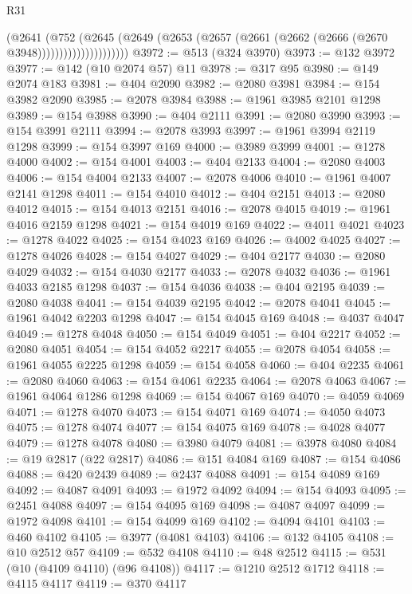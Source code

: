 \begin{lexlean}{R31}
\begin{coremodule}
                          (@2641
                            (@752
                              (@2645
                                (@2649
                                  (@2653
                                    (@2657 (@2661 (@2662 (@2666 (@2670 @3948)))))))))))))))))))))
@3972 := @513 (@324 @3970)
@3973 := @132 @3972
@3977 := @142 (@10 @2074 @57) @11
@3978 := @317 @95
@3980 := @149 @2074 @183
@3981 := @404 @2090
@3982 := @2080 @3981
@3984 := @154 @3982 @2090
@3985 := @2078 @3984
@3988 := @1961 @3985 @2101 @1298
@3989 := @154 @3988
@3990 := @404 @2111
@3991 := @2080 @3990
@3993 := @154 @3991 @2111
@3994 := @2078 @3993
@3997 := @1961 @3994 @2119 @1298
@3999 := @154 @3997 @169
@4000 := @3989 @3999
@4001 := @1278 @4000
@4002 := @154 @4001
@4003 := @404 @2133
@4004 := @2080 @4003
@4006 := @154 @4004 @2133
@4007 := @2078 @4006
@4010 := @1961 @4007 @2141 @1298
@4011 := @154 @4010
@4012 := @404 @2151
@4013 := @2080 @4012
@4015 := @154 @4013 @2151
@4016 := @2078 @4015
@4019 := @1961 @4016 @2159 @1298
@4021 := @154 @4019 @169
@4022 := @4011 @4021
@4023 := @1278 @4022
@4025 := @154 @4023 @169
@4026 := @4002 @4025
@4027 := @1278 @4026
@4028 := @154 @4027
@4029 := @404 @2177
@4030 := @2080 @4029
@4032 := @154 @4030 @2177
@4033 := @2078 @4032
@4036 := @1961 @4033 @2185 @1298
@4037 := @154 @4036
@4038 := @404 @2195
@4039 := @2080 @4038
@4041 := @154 @4039 @2195
@4042 := @2078 @4041
@4045 := @1961 @4042 @2203 @1298
@4047 := @154 @4045 @169
@4048 := @4037 @4047
@4049 := @1278 @4048
@4050 := @154 @4049
@4051 := @404 @2217
@4052 := @2080 @4051
@4054 := @154 @4052 @2217
@4055 := @2078 @4054
@4058 := @1961 @4055 @2225 @1298
@4059 := @154 @4058
@4060 := @404 @2235
@4061 := @2080 @4060
@4063 := @154 @4061 @2235
@4064 := @2078 @4063
@4067 := @1961 @4064 @1286 @1298
@4069 := @154 @4067 @169
@4070 := @4059 @4069
@4071 := @1278 @4070
@4073 := @154 @4071 @169
@4074 := @4050 @4073
@4075 := @1278 @4074
@4077 := @154 @4075 @169
@4078 := @4028 @4077
@4079 := @1278 @4078
@4080 := @3980 @4079
@4081 := @3978 @4080
@4084 := @19 @2817 (@22 @2817)
@4086 := @151 @4084 @169
@4087 := @154 @4086
@4088 := @420 @2439
@4089 := @2437 @4088
@4091 := @154 @4089 @169
@4092 := @4087 @4091
@4093 := @1972 @4092
@4094 := @154 @4093
@4095 := @2451 @4088
@4097 := @154 @4095 @169
@4098 := @4087 @4097
@4099 := @1972 @4098
@4101 := @154 @4099 @169
@4102 := @4094 @4101
@4103 := @460 @4102
@4105 := @3977 (@4081 @4103)
@4106 := @132 @4105
@4108 := @10 @2512 @57
@4109 := @532 @4108
@4110 := @48 @2512
@4115 := @531 (@10 (@4109 @4110) (@96 @4108))
@4117 := @1210 @2512 @1712
@4118 := @4115 @4117
@4119 := @370 @4117

\end{coremodule}
\end{lexlean}
